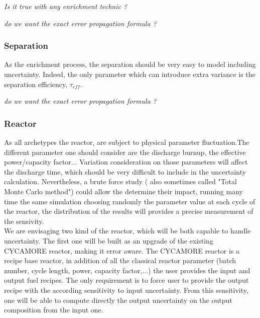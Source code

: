 \documentclass[dvips,12pt]{article}
\begin{document}
\textit{Is it true with any enrichment technic ?}

\textit{do we want the exact error propagation formula ?}

\subsubsection{Separation}
As the enrichment process, the separation should be very easy to model including uncertainty. Indeed, the only parameter which can introduce extra variance is the separation efficiency, $\tau_{eff}$.%

\textit{do we want the exact error propagation formula ?}

\subsubsection{Reactor}
As all archetypes the reactor, are subject to physical parameter fluctuation.The different parameter one should consider are the discharge burnup, the effective power/capacity factor... Variation consideration on those parameters will affect the discharge time, which should be very difficult to include in the uncertainty calculation. Nevertheless, a brute force study ( also sometimes called "Total Monte Carlo method") could allow the determine their impact, running many time the same simulation choosing randomly the parameter value at each cycle of the reactor, the distribution of the results will provides a precise measurement of the sensivity.\\

We are envisaging two kind of the reactor, which will be both capable to handle uncertainty. The first one will be built as an upgrade of the existing CYCAMORE reactor, making it error aware. The CYCAMORE reactor is a recipe base reactor, in addition of all the classical reactor parameter (batch number, cycle length, power, capacity factor,...) the user provides the input and output fuel recipes. The only requirement is to force user to provide the output recipe with the according sensitivity to input uncertainty. From this sensitivity, one will be able to compute directly the output uncertainty on the output composition from the input one.\\
\end{document}
